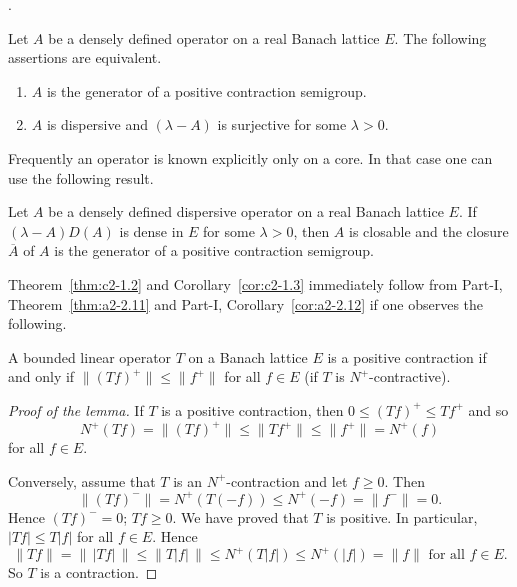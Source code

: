 \textcite{phillips:1962}.
\begin{theorem}\label{thm:c2-1.2}
%
%
Let $A$ be a densely defined operator on a real Banach lattice $E$. 
The following assertions are equivalent.
\begin{enumerate}[\upshape (a)]
\item \label{thm:c2-1.2-1}
$A$ is the generator of a positive contraction semigroup.
\item \label{thm:c2-1.2-2}
$A$ is dispersive and $(\lambda-A)$ is surjective for some $\lambda > 0$.
\end{enumerate}
\end{theorem}
Frequently an operator is known explicitly only on a core. In that case one can use the following result.
\begin{corollary}\label{cor:c2-1.3}
%
Let $A$ be a densely defined dispersive operator on a real Banach lattice $E$. 
If\/ $(\lambda - A)D(A)$ is dense in $E$ for some $\lambda > 0$, then $A$ is closable and the closure $\overline{A}$ of\/ $A$ is the generator of a positive contraction semigroup.
\end{corollary}
Theorem~\ref{thm:c2-1.2}  and Corollary~\ref{cor:c2-1.3}  immediately follow from Part-I, Theorem~\ref{thm:a2-2.11} and Part-I, Corollary~\ref{cor:a2-2.12}  if one observes the following.
\begin{lemma}\label{lem:c2-1.4}
%
A bounded linear operator  $T$ on a Banach lattice $E$ is a positive contraction if and only if\/ $\|(Tf)^{+}\| \leq \|f^{+}\|$ for all $f \in E$ (\ie if\/ $T$ is $N^{+}$-contractive).
\end{lemma}
\begin{proof}[Proof of the lemma]
If\/ $T$ is a positive contraction, then $0 \leq (Tf)^{+} \leq Tf^{+}$ and so 
%
\[
	N^{+}(Tf) = \|(Tf)^{+}\| \leq \|Tf^{+}\| \leq \|f^{+}\| = N^{+}(f)
\]
%
for all $f \in E$. 

Conversely, assume that $T$ is an $N^{+}$-contraction and let $f \geq 0$. 
Then 
\[
\|(Tf)^{-}\| = N^{+}(T(-f)) \leq N^{+}(-f) = \|f^{-}\| = 0 .
\]
Hence $(Tf)^{-} = 0$; \ie $Tf \geq 0$. 
We have proved that $T$ is positive. 
In particular, $|Tf| \leq T|f|$ for all $f \in E$. 
Hence 
\[
\|Tf\| = \|\,|Tf|\,\| \leq \|T|f|\,\| \leq N^{+}(T|f|) \leq N^{+}(|f|) = \|f\| \text{ for all } f \in E .
\]
So $T$ is a contraction.
\end{proof}
